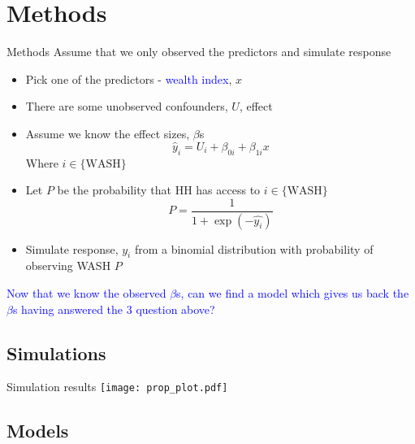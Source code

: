 \documentclass{beamer}
\begin{document}
\section{Methods}
\begin{frame}{Methods}
Assume that we only observed the predictors and simulate response
\begin{itemize}[<+->]
\item Pick one of the predictors - \textcolor{blue}{wealth index}, $x$
\item There are some unobserved confounders, $U$, effect
\item Assume we know the effect sizes, $\beta$s
\pause
\[
\hat{y}_i = U_i + \beta_{0i} + \beta_{1i}x
\]
Where $i\in\{\text{WASH}\}$
\item Let $P$ be the probability that HH has access to $i\in\{\text{WASH}\}$
\[
P = \frac{1}{1 + \exp{(-\hat{y_i})}}
\]
\item Simulate response, $y_i$ from a binomial distribution with probability of observing WASH $P$
\end{itemize}
\pause
\textcolor{blue}{Now that we know the observed $\beta$s, can we find a model which gives us back the $\beta$s having answered the 3 question above?}
\end{frame}

\subsection{Simulations}
\begin{frame}{Simulation results}
\centering
\texttt{[image: prop\_plot.pdf]}
\end{frame}

\subsection{Models}
\end{document}
